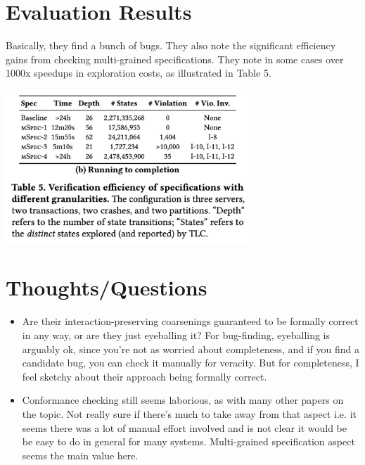 \documentclass[11pt, oneside]{article}   	%
\begin{document}
\section*{Evaluation Results}

Basically, they find a bunch of bugs. They also note the significant efficiency gains from checking multi-grained specifications. They note in some cases over 1000x speedups in exploration costs, as illustrated in Table 5.


\begin{center}
    \includegraphics[width=0.7\textwidth]{efficiencies.png}
\end{center}




\section*{Thoughts/Questions}
\begin{itemize}
    \item Are their interaction-preserving coarsenings guaranteed to be formally correct in any way, or are they just eyeballing it? For bug-finding, eyeballing is arguably ok, since you're not as worried about completeness, and if you find a candidate bug, you can check it manually for veracity. But for completeness, I feel sketchy about their approach being formally correct.
    \item Conformance checking still seems laborious, as with many other papers on the topic. Not really sure if there's much to take away from that aspect i.e. it seems there was a lot of manual effort involved and is not clear it would be be easy to do in general for many systems. Multi-grained specification aspect seems the main value here.
\end{itemize}


 

\end{document}
